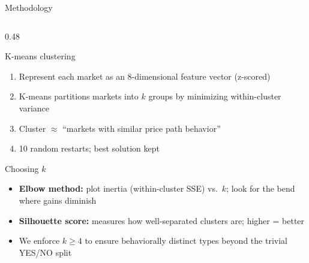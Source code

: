 \documentclass[10pt, aspectratio=169]{beamer}
\begin{document}
\begin{frame}{Methodology}
  \begin{columns}[T]
    \begin{column}{0.48\textwidth}
      \begin{block}{K-means clustering}
        \begin{enumerate}
          \item Represent each market as an 8-dimensional
                feature vector (z-scored)
          \item K-means partitions markets into $k$ groups by
                minimizing within-cluster variance
          \item Cluster $\approx$ ``markets with similar
                price path behavior''
          \item 10 random restarts; best solution kept
        \end{enumerate}
      \end{block}

      \medskip
      \begin{block}{Choosing $k$}
        \begin{itemize}
          \item \textbf{Elbow method:} plot inertia
                (within-cluster SSE) vs.\ $k$; look for
                the bend where gains diminish
          \item \textbf{Silhouette score:} measures
                how well-separated clusters are;
                higher = better
          \item We enforce $k \geq 4$ to ensure
                behaviorally distinct types beyond
                the trivial YES/NO split
        \end{itemize}
      \end{block}
    \end{column}


\end{columns}
\end{frame}
\end{document}
